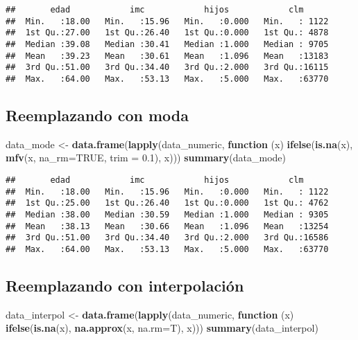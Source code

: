 \documentclass[
]{article}
\newenvironment{Shaded}{\begin{snugshade}}{\end{snugshade}}
\newcommand{\AttributeTok}[1]{\textcolor[rgb]{0.13,0.29,0.53}{#1}}
\newcommand{\ConstantTok}[1]{\textcolor[rgb]{0.56,0.35,0.01}{#1}}
\newcommand{\ControlFlowTok}[1]{\textcolor[rgb]{0.13,0.29,0.53}{\textbf{#1}}}
\newcommand{\FloatTok}[1]{\textcolor[rgb]{0.00,0.00,0.81}{#1}}
\newcommand{\FunctionTok}[1]{\textcolor[rgb]{0.13,0.29,0.53}{\textbf{#1}}}
\newcommand{\NormalTok}[1]{#1}
\newcommand{\OtherTok}[1]{\textcolor[rgb]{0.56,0.35,0.01}{#1}}
\begin{document}
\begin{verbatim}
##       edad            imc            hijos            clm       
##  Min.   :18.00   Min.   :15.96   Min.   :0.000   Min.   : 1122  
##  1st Qu.:27.00   1st Qu.:26.40   1st Qu.:0.000   1st Qu.: 4878  
##  Median :39.08   Median :30.41   Median :1.000   Median : 9705  
##  Mean   :39.23   Mean   :30.61   Mean   :1.096   Mean   :13183  
##  3rd Qu.:51.00   3rd Qu.:34.40   3rd Qu.:2.000   3rd Qu.:16115  
##  Max.   :64.00   Max.   :53.13   Max.   :5.000   Max.   :63770
\end{verbatim}

\subsection{Reemplazando con moda}\label{reemplazando-con-moda}

\begin{Shaded}
\begin{Highlighting}[]
\NormalTok{data\_mode }\OtherTok{\textless{}{-}}  \FunctionTok{data.frame}\NormalTok{(}\FunctionTok{lapply}\NormalTok{(data\_numeric, }\ControlFlowTok{function}\NormalTok{ (x) }\FunctionTok{ifelse}\NormalTok{(}\FunctionTok{is.na}\NormalTok{(x), }\FunctionTok{mfv}\NormalTok{(x, }\AttributeTok{na\_rm=}\ConstantTok{TRUE}\NormalTok{, }\AttributeTok{trim =} \FloatTok{0.1}\NormalTok{), x)))}
\FunctionTok{summary}\NormalTok{(data\_mode)}
\end{Highlighting}
\end{Shaded}

\begin{verbatim}
##       edad            imc            hijos            clm       
##  Min.   :18.00   Min.   :15.96   Min.   :0.000   Min.   : 1122  
##  1st Qu.:25.00   1st Qu.:26.40   1st Qu.:0.000   1st Qu.: 4762  
##  Median :38.00   Median :30.59   Median :1.000   Median : 9305  
##  Mean   :38.13   Mean   :30.66   Mean   :1.096   Mean   :13254  
##  3rd Qu.:51.00   3rd Qu.:34.40   3rd Qu.:2.000   3rd Qu.:16586  
##  Max.   :64.00   Max.   :53.13   Max.   :5.000   Max.   :63770
\end{verbatim}

\subsection{Reemplazando con
interpolación}\label{reemplazando-con-interpolaciuxf3n}

\begin{Shaded}
\begin{Highlighting}[]
\NormalTok{data\_interpol }\OtherTok{\textless{}{-}} \FunctionTok{data.frame}\NormalTok{(}\FunctionTok{lapply}\NormalTok{(data\_numeric, }\ControlFlowTok{function}\NormalTok{ (x) }\FunctionTok{ifelse}\NormalTok{(}\FunctionTok{is.na}\NormalTok{(x), }\FunctionTok{na.approx}\NormalTok{(x, }\AttributeTok{na.rm=}\NormalTok{T), x)))}
\FunctionTok{summary}\NormalTok{(data\_interpol)}
\end{Highlighting}
\end{Shaded}
\end{document}
